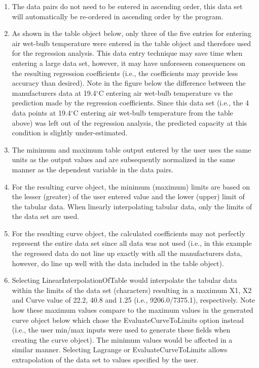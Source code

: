 \begin{enumerate}
\item The data pairs do not need to be entered in ascending order, this data set will automatically be re-ordered in ascending order by the program.
\item As shown in the table object below, only three of the five entries for entering air wet-bulb temperature were entered in the table object and therefore used for the regression analysis. This data entry technique may save time when entering a large data set, however, it may have unforeseen consequences on the resulting regression coefficients (i.e., the coefficients may provide less accuracy than desired). Note in the figure below the difference between the manufacturers data at 19.4\(^{\circ}\)C entering air wet-bulb temperature vs the prediction made by the regression coefficients. Since this data set (i.e., the 4 data points at 19.4\(^{\circ}\)C entering air wet-bulb temperature from the table above) was left out of the regression analysis, the predicted capacity at this condition is slightly under-estimated.
\item The minimum and maximum table output entered by the user uses the same units as the output values and are subsequently normalized in the same manner as the dependent variable in the data pairs.
\item For the resulting curve object, the minimum (maximum) limits are based on the lesser (greater) of the user entered value and the lower (upper) limit of the tabular data. When linearly interpolating tabular data, only the limits of the data set are used.
\item For the resulting curve object, the calculated coefficients may not perfectly represent the entire data set since all data was not used (i.e., in this example the regressed data do not line up exactly with all the manufacturers data, however, do line up well with the data included in the table object).
\item Selecting LinearInterpolationOfTable would interpolate the tabular data within the limits of the data set (characters) resulting in a maximum X1, X2 and Curve value of 22.2, 40.8 and 1.25 (i.e., 9206.0/7375.1), respectively. Note how these maximum values compare to the maximum values in the generated curve object below which chose the EvaluateCurveToLimits option instead (i.e., the user min/max inputs were used to generate these fields when creating the curve object). The minimum values would be affected in a similar manner. Selecting Lagrange or EvaluateCurveToLimits allows extrapolation of the data set to values specified by the user.

\end{enumerate}
